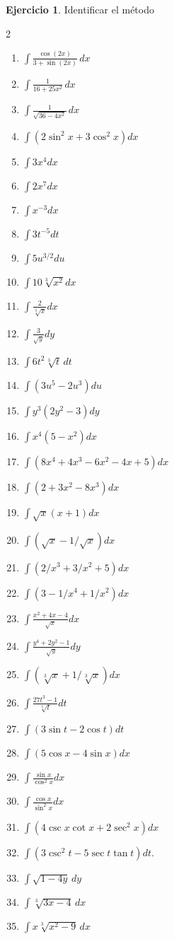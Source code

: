 \documentclass[12pt]{article}
\theoremstyle{definition}
\newtheorem{Ejer}[teorema]{Ejercicio}
\theoremstyle{remark}
\begin{document}
\begin{Ejer}{Identificar el método}
\begin{multicols}{2}
\begin{enumerate}[resume=integrales]
\item $\displaystyle \int\frac{\cos(2x)}{3+\sin(2x)}\,dx$
\item $\displaystyle \int\frac{1}{16+25x^2}\,dx$
\item $\displaystyle \int\frac{1}{\sqrt{36-4x^2}}\,dx$
\item $\displaystyle \int\left(2\sin^2x+3\cos^2x\right)dx$
\item $\int3x^4dx$ 
\item $\int2x^7dx$ 
\item $\int x^{-3}dx$ 
\item $\int3t^{-5}dt$
\item $\int5u^{3/2}du$
 \item $\int10\sqrt[3]{x^2}dx$ 
 \item $\int\frac2{\sqrt[3]x}dx$ 
 \item $\int\frac3{\sqrt y}dy$
\item $\int6t^2\sqrt[3]t\,dt$ 
\item $\int(3u^5-2u^3)du$ 
\item $\int y^3(2y^2-3)dy$ 
\item $\int x^4(5-x^2)dx$
\item $\int(8x^4+4x^3-6x^2-4x+5)dx$ 
\item $\int(2+3x^2-8x^3)dx$ 
\item $\int\sqrt{x}(x+1)dx$
\item $\int(\sqrt x-1/\sqrt x)dx$ 
\item $\int(2/x^3+3/x^2+5)dx$ 
\item $\int(3-1/x^4+1/x^2)dx$
\item $\int\frac{x^2+4x-4}{\sqrt x}dx$ 
\item $\int\frac{y^4+2y^2-1}{\sqrt y}dy$ 
\item $\int(\sqrt[3]x+1/\sqrt[3]x)dx$
\item $\int\frac{27t^3-1}{\sqrt[3]t}dt$ 
\item $\int(3\sin t-2\cos t)dt$ 
\item $\int(5\cos x-4\sin x)dx$
\item $\int\frac{\sin x}{\cos^2x}dx$ 
\item $\int\frac{\cos x}{\sin^2x}dx$ 
\item $\int(4\csc x\cot x+2\sec^2x)dx$ 
\item $\int(3\csc^2t-5\sec t\tan t)dt$.
\item $\int\sqrt{1-4y}\,dy$ 
\item $\int\sqrt[3]{3x-4}\,dx$ 
\item $\int x\sqrt[3]{x^2-9}\,dx$ 

\end{enumerate}
\end{multicols}
\end{Ejer}
\end{document}
